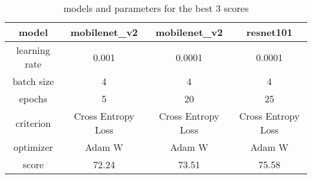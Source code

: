 \documentclass{article}
\begin{document}
\begin{table}
\centering
\begin{tabular}{|c|c|c|c|}
\hline
    model & mobilenet\_v2 & mobilenet\_v2 & resnet101 \\
    \hline
    learning rate & 0.001 & 0.0001 & 0.0001 \\
    \hline
    batch size & 4 & 4 & 4 \\
    \hline
    epochs & 5 & 20 & 25 \\
    \hline
    criterion & Cross Entropy Loss & Cross Entropy Loss & Cross Entropy Loss \\
    \hline
    optimizer & Adam W & Adam W & Adam W \\
    \hline
    score & 72.24 & 73.51 & 75.58 \\
    \hline
\end{tabular}

\caption{\label{tab:widgets} models and parameters for the best 3 scores}
\end{table}
\end{document}
